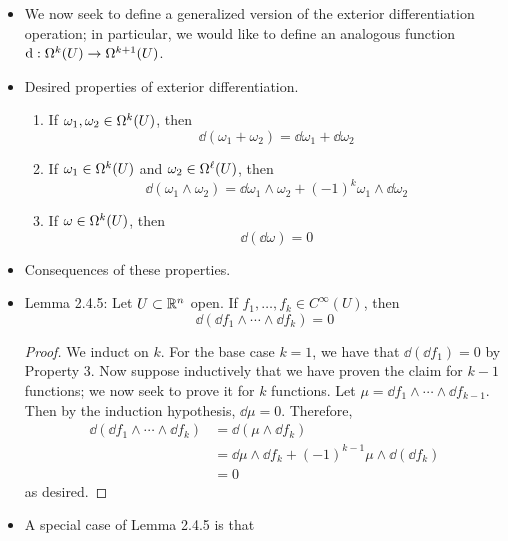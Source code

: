 \documentclass[../notes.tex]{subfiles}
\begin{document}
\begin{itemize}
    \item We now seek to define a generalized version of the exterior differentiation operation; in particular, we would like to define an analogous function $\dd:\ome[k]{U}\to\ome[k+1]{U}$.
    \item Desired properties of exterior differentiation.
    \begin{enumerate}
        \item If $\omega_1,\omega_2\in\ome[k]{U}$, then
        \begin{equation*}
            \dd(\omega_1+\omega_2) = \dd\omega_1+\dd\omega_2
        \end{equation*}
        \item If $\omega_1\in\ome[k]{U}$ and $\omega_2\in\ome[\ell]{U}$, then
        \begin{equation*}
            \dd(\omega_1\wedge\omega_2) = \dd\omega_1\wedge\omega_2+(-1)^k\omega_1\wedge\dd\omega_2
        \end{equation*}
        \item If $\omega\in\ome[k]{U}$, then
        \begin{equation*}
            \dd(\dd\omega) = 0
        \end{equation*}
    \end{enumerate}
    \item Consequences of these properties.
    \item Lemma 2.4.5: Let $U\subset\R^n$ open. If $f_1,\dots,f_k\in C^\infty(U)$, then
    \begin{equation*}
        \dd(\dd f_1\wedge\cdots\wedge\dd f_k) = 0
    \end{equation*}
    \begin{proof}
        We induct on $k$. For the base case $k=1$, we have that $\dd(\dd f_1)=0$ by Property 3. Now suppose inductively that we have proven the claim for $k-1$ functions; we now seek to prove it for $k$ functions. Let $\mu=\dd f_1\wedge\cdots\wedge\dd f_{k-1}$. Then by the induction hypothesis, $\dd\mu=0$. Therefore,
        \begin{align*}
            \dd(\dd f_1\wedge\cdots\wedge\dd f_k) &= \dd(\mu\wedge\dd f_k)\\
            &= \dd\mu\wedge\dd f_k+(-1)^{k-1}\mu\wedge\dd(\dd f_k)\tag*{Property 2}\\
            &= 0
        \end{align*}
        as desired.
    \end{proof}
    \item A special case of Lemma 2.4.5 is that

\end{itemize}
\end{document}
